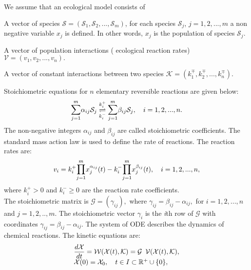 \documentclass[a4paper,12pt]{article}
\begin{document}
We assume that an ecological model consists of       
\begin{description}          
\item[$\bullet$] A vector of species   
 $\mathcal{S}=(\mathcal{S}_{1} , \mathcal{S}_{2}, ... , \mathcal{S}_{m})$,   
 for each species $\mathcal{S}_{j}$, $j=1,2,...,m$ a non negative variable $x_{j}$ is defined. In other words, $x_{j}$ is the population of species $\mathcal{S}_{j}$.   
\item[$\bullet$] A vector of population interactions ( ecological reaction rates) 
 $\mathcal{V}=(v_{1}, v_{2}, ... , v_{n}).$    
\item[$\bullet$] A vector of constant interactions between two species   
$\mathcal{K}=(k_{1}^{\mp}, k_{2}^{\mp}, ... , k_{n}^{\mp})$.         
\end{description}
\noindent Stoichiometric equations for $n$ elementary reversible reactions are given below:  
\begin{equation} 
\begin{array}{llll}  
 \mathlarger{\mathlarger{\sum\limits}}_{j=1}^m \alpha_{ij} \mathcal{S}_{j} \underset{k_{i}^{-}}{ \overset{k_{i}^{+}}{\rightleftharpoons}}\mathlarger{\mathlarger{\sum\limits}}_{j=1}^m \beta_{ij} \mathcal{S}_{j}, \quad i=1,2,...,n .
\end{array}
\label{elementry}  
 \end{equation}  
The non-negative integers $\alpha_{ij}$ and $\beta_{ij}$ are called stoichiometric coefficients. The standard mass action law is used to define the rate of reactions. The reaction rates are:
\begin{equation}
\begin{array}{llll}  
 v_{i} = k_{i}^{+} \mathlarger{\mathlarger{\prod\limits}}_{j=1}^m x_{j}^{\alpha_{ij}}(t)-k_{i}^{-} \mathlarger{\mathlarger{\prod\limits}}_{j=1}^m x_{j}^{\beta_{ij}}(t), \quad i=1,2,...,n ,
\end{array}
\label{rates}
 \end{equation}
where $k_{i}^{+} > 0$ and $k_{i}^{-} \geq 0$ are the reaction rate coefficients. \\         
The stoichiometric matrix is $\mathcal{G}=(\gamma_{ij}),$ where $\gamma_{ij}=\beta_{ij}-\alpha_{ij},$ for $ i=1,2,...,n$ and   $j=1,2,..,m$. The stoichiometric vector $\gamma_{i}$ is the \textit{i}th row of $\mathcal{G}$ with coordinates $\gamma_{ij}=\beta_{ij}-\alpha_{ij}$.
\noindent The system of ODE describes the dynamics of chemical reactions. The kinetic equations are:
\begin{equation}
\begin{array}{llll}  
\dfrac{d\mathcal{X}}{dt}=\mathcal{W}(\mathcal{X}(t), \mathcal{K})=\mathcal{G} \enskip \mathcal{V}(\mathcal{X}(t), \mathcal{K}), \\
\mathcal{X}(0)=\mathcal{X}_{0}, \quad  t \in I\subset \mathbb{R}^{+}\cup \lbrace 0\rbrace, 
\end{array}
\label{eq1} 
 \end{equation}  
\end{document}
